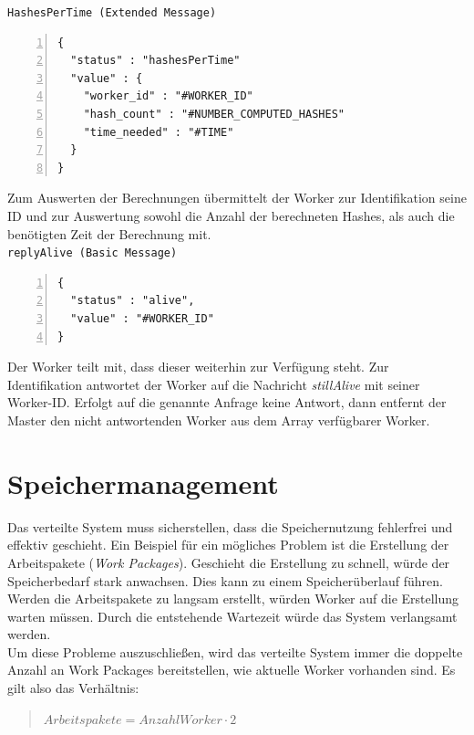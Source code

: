 \texttt{HashesPerTime (Extended Message)}
\begin{lstlisting}[basicstyle=\ttfamily,numbers=left,numberstyle=\footnotesize\ttfamily,backgroundcolor=\color{sourcegray}]
{
  "status" : "hashesPerTime"
  "value" : {
    "worker_id" : "#WORKER_ID"
    "hash_count" : "#NUMBER_COMPUTED_HASHES"
    "time_needed" : "#TIME"
  }
}
\end{lstlisting}
Zum Auswerten der Berechnungen übermittelt der Worker zur Identifikation seine ID und zur Auswertung sowohl die Anzahl der berechneten Hashes, als auch die benötigten Zeit der Berechnung mit. \\

\texttt{replyAlive (Basic Message)}
\begin{lstlisting}[basicstyle=\ttfamily,numbers=left,numberstyle=\footnotesize\ttfamily,backgroundcolor=\color{sourcegray}]
{
  "status" : "alive",
  "value" : "#WORKER_ID"
}
\end{lstlisting}
Der Worker teilt mit, dass dieser weiterhin zur Verfügung steht. Zur Identifikation antwortet der Worker auf die Nachricht 
\emph{stillAlive} mit seiner Worker-ID. Erfolgt auf die genannte Anfrage keine Antwort, dann entfernt der Master den nicht antwortenden Worker aus dem Array verfügbarer Worker.\\



\section{Speichermanagement}
Das verteilte System muss sicherstellen, dass die Speichernutzung fehlerfrei und effektiv geschieht. Ein Beispiel für ein mögliches Problem ist die Erstellung der Arbeitspakete (\emph{Work Packages}). Geschieht die Erstellung zu schnell, würde der Speicherbedarf stark anwachsen. Dies kann zu einem Speicherüberlauf führen. Werden die Arbeitspakete zu langsam erstellt, würden Worker auf die Erstellung warten müssen. Durch die entstehende Wartezeit würde das System verlangsamt werden. \\
Um diese Probleme auszuschließen, wird das verteilte System immer die doppelte Anzahl an Work Packages bereitstellen, wie aktuelle Worker vorhanden sind. Es gilt also das Verhältnis:

\begin{quotation}
\begin{math}
Arbeitspakete = Anzahl Worker \cdot 2 \end{math}
\end{quotation}


